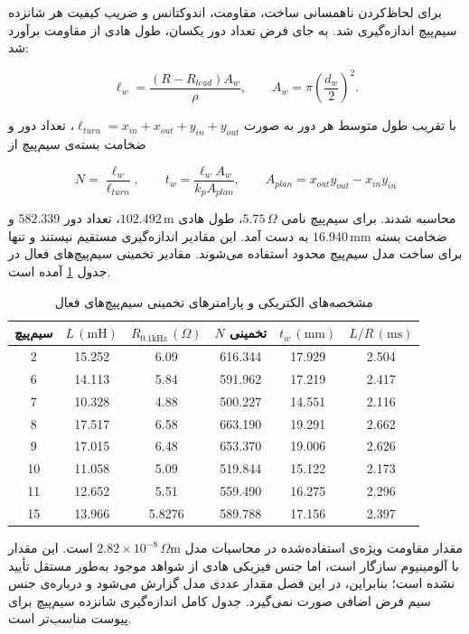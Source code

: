 برای لحاظ‌کردن ناهمسانی ساخت، مقاومت، اندوکتانس و ضریب کیفیت هر شانزده سیم‌پیچ اندازه‌گیری شد. به جای فرض تعداد دور یکسان، طول هادی از مقاومت برآورد شد:

\begin{equation}
	\ell_w=\frac{(R-R_{lead})A_w}{\rho},
	\qquad A_w=\pi\left(\frac{d_w}{2}\right)^2.
	\label{eq:method-wire-length}
\end{equation}

با تقریب طول متوسط هر دور به صورت $\ell_{turn}=x_{in}+x_{out}+y_{in}+y_{out}$، تعداد دور و ضخامت بسته‌ی سیم‌پیچ از

\begin{equation}
	N=\frac{\ell_w}{\ell_{turn}},
	\qquad
	t_w=\frac{\ell_wA_w}{k_pA_{plan}},
	\qquad
	A_{plan}=x_{out}y_{out}-x_{in}y_{in}
	\label{eq:method-winding-inference}
\end{equation}

محاسبه شدند. برای سیم‌پیچ نامی $5.75\,\Omega$، طول هادی $102.492\,\mathrm m$، تعداد دور $582.339$ و ضخامت بسته $16.940\,\mathrm{mm}$ به دست آمد. این مقادیر اندازه‌گیری مستقیم نیستند و تنها برای ساخت مدل سیم‌پیچ محدود استفاده می‌شوند. مقادیر تخمینی سیم‌پیچ‌های فعال در جدول \ref{tab:method-active-coil-properties} آمده است.

\begin{table}[htbp]
	\centering
	\scriptsize
	\caption{مشخصه‌های الکتریکی و پارامترهای تخمینی سیم‌پیچ‌های فعال}
	\label{tab:method-active-coil-properties}
	\begin{tabular}{|c|c|c|c|c|c|}
		\hline
		\textbf{سیم‌پیچ} & $L\,(\mathrm{mH})$ & $R_{0.1\mathrm{kHz}}\,(\Omega)$ & $N$ تخمینی & $t_w\,(\mathrm{mm})$ & $L/R\,(\mathrm{ms})$\\ \hline
		2&15.252&6.09&616.344&17.929&2.504\\ \hline
		6&14.113&5.84&591.962&17.219&2.417\\ \hline
		7&10.328&4.88&500.227&14.551&2.116\\ \hline
		8&17.517&6.58&663.190&19.291&2.662\\ \hline
		9&17.015&6.48&653.370&19.006&2.626\\ \hline
		10&11.058&5.09&519.844&15.122&2.173\\ \hline
		11&12.652&5.51&559.490&16.275&2.296\\ \hline
		15&13.966&5.8276&589.788&17.156&2.397\\ \hline
	\end{tabular}
\end{table}

مقدار مقاومت ویژه‌ی استفاده‌شده در محاسبات مدل $2.82\times10^{-8}\,\Omega\mathrm m$ است. این مقدار با آلومینیوم سازگار است، اما جنس فیزیکی هادی از شواهد موجود به‌طور مستقل تأیید نشده است؛ بنابراین، در این فصل مقدار عددی مدل گزارش می‌شود و درباره‌ی جنس سیم فرض اضافی صورت نمی‌گیرد. جدول کامل اندازه‌گیری شانزده سیم‌پیچ برای پیوست مناسب‌تر است.

